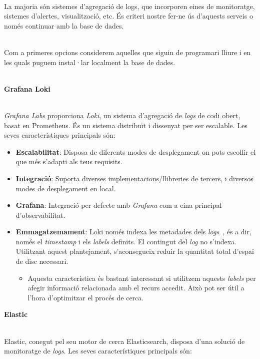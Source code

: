 \noindent \\
La majoria són sistemes d’agregació de logs, que incorporen eines de monitoratge, sistemes d’alertes, visualització, etc.
És criteri nostre fer-ne ús d’aquests serveis o només continuar amb la base de dades.

\noindent \\
Com a primeres opcions considerem aquelles que siguin de programari lliure i en les quals puguem instal·lar localment la base de dades.

\noindent \\
\textbf{Grafana Loki~\cite{loki:main}}\label{subsubsec:log-db-option-loki}

\noindent \\
\textit{Grafana Labs} proporciona \textit{Loki}, un sistema d’agregació de \textit{\gls{log}s} de codi obert, basat en Prometheus.
És un sistema distribuït i dissenyat per ser escalable.
Les seves característiques principals són:

\begin{itemize}
    \item \textbf{Escalabilitat}: Disposa de diferents modes de desplegament on pots escollir el que més s’adapti als teus requisits.
    \item \textbf{Integració}: Suporta diverses implementacions/llibreries de tercers, i diversos modes de desplegament en local.
    \item \textbf{Grafana}: Integració per defecte amb \textit{Grafana} com a eina principal d’observabilitat.
    \item \textbf{Emmagatzemament}: Loki només indexa les metadades dels \textit{\gls{log}s}~\cite{loki:indexing}, és a dir, només el \textit{\gls{timestamp}} i els \textit{labels} definits.
    El contingut del \textit{\gls{log}} no s’indexa.
    Utilitzant aquest plantejament, s’aconsegueix reduir la quantitat total d'espai de disc necessari.
    \begin{itemize}
        \item Aquesta característica és bastant interessant si utilitzem aquests \textit{labels} per afegir informació relacionada amb el recurs accedit.
        Això pot ser útil a l'hora d'optimitzar el procés de cerca.
    \end{itemize}
\end{itemize}

\clearpage

\noindent
\textbf{Elastic~\cite{elastic}}

\noindent \\
Elastic, conegut pel seu motor de cerca Elasticsearch, disposa d’una solució de monitoratge de \textit{\gls{log}s}.
Les seves característiques principals són:

